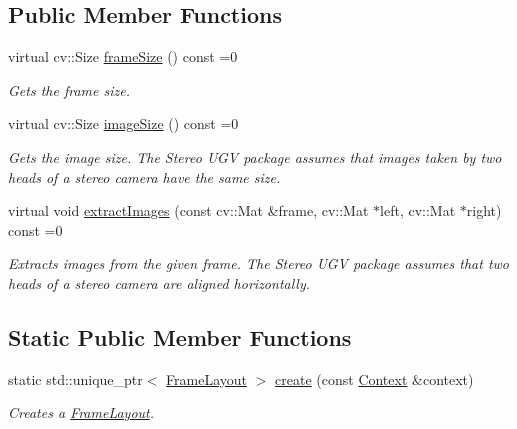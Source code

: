 \subsection*{Public Member Functions}
\begin{DoxyCompactItemize}
\item 
virtual cv\+::\+Size \hyperlink{classstereo__ugv_1_1FrameLayout_a59da4ac9d0cc6a43cccbf8666849bdc2}{frame\+Size} () const =0
\begin{DoxyCompactList}\small\item\em Gets the frame size. \end{DoxyCompactList}\item 
virtual cv\+::\+Size \hyperlink{classstereo__ugv_1_1FrameLayout_a12cc36a89f8e66ffc6a2fa5eb3c5f648}{image\+Size} () const =0
\begin{DoxyCompactList}\small\item\em Gets the image size. The Stereo U\+GV package assumes that images taken by two heads of a stereo camera have the same size. \end{DoxyCompactList}\item 
virtual void \hyperlink{classstereo__ugv_1_1FrameLayout_af5ab49a35cfbb59a79863720e7985d29}{extract\+Images} (const cv\+::\+Mat \&frame, cv\+::\+Mat $\ast$left, cv\+::\+Mat $\ast$right) const =0
\begin{DoxyCompactList}\small\item\em Extracts images from the given frame. The Stereo U\+GV package assumes that two heads of a stereo camera are aligned horizontally. \end{DoxyCompactList}\end{DoxyCompactItemize}
\subsection*{Static Public Member Functions}
\begin{DoxyCompactItemize}
\item 
static std\+::unique\+\_\+ptr$<$ \hyperlink{classstereo__ugv_1_1FrameLayout}{Frame\+Layout} $>$ \hyperlink{classstereo__ugv_1_1FrameLayout_adaaac30572f6e3b6fc88da66873c2e77}{create} (const \hyperlink{classstereo__ugv_1_1Context}{Context} \&context)
\begin{DoxyCompactList}\small\item\em Creates a \hyperlink{classstereo__ugv_1_1FrameLayout}{Frame\+Layout}. \end{DoxyCompactList}\end{DoxyCompactItemize}


